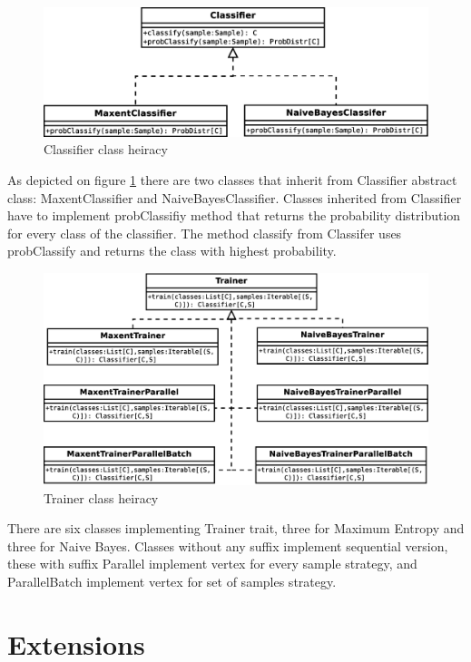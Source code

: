 \documentclass{report}
\begin{document}
\begin{figure}[!htb]
  \centering
  \includegraphics*[scale=0.45]{classes1.eps}
  \caption{Classifier class heiracy}
  \label{fig:classes1}
\end{figure}

As depicted on figure \ref{fig:classes1} there are two classes that inherit from Classifier abstract class: MaxentClassifier and NaiveBayesClassifier. Classes inherited from Classifier have to implement probClassifiy method that returns the probability distribution for every class of the classifier. The method classify from Classifer uses probClassify and returns the class with highest probability.

\begin{figure}[!htb]
  \centering
  \includegraphics*[scale=0.45]{classes2.eps}
  \caption{Trainer class heiracy}
  \label{fig:classes2}
\end{figure}

There are six classes  implementing Trainer trait, three for Maximum Entropy and three for Naive Bayes. Classes without any suffix implement sequential version, these with suffix Parallel implement vertex for every sample strategy, and ParallelBatch implement vertex for set of samples strategy.

\section{Extensions}
\end{document}
